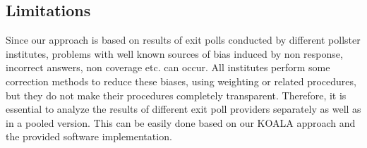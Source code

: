 \documentclass[smallcondensed]{svjour3}     %
\begin{document}
\subsection{Limitations}
Since our approach is based on results of exit polls conducted by different pollster institutes, problems with well known sources of bias induced by non response, incorrect answers, non coverage etc. can occur. All institutes perform some correction methods to reduce these biases, using weighting or related procedures, but they do not make their procedures completely transparent. Therefore, it is essential to analyze the results of different exit poll providers separately as well as in a pooled version. This can be easily done based on our KOALA approach and the provided software implementation.
%


\end{document}
